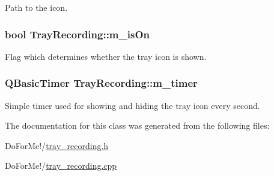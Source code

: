 Path to the icon. 

\hypertarget{class_tray_recording_a691345e2feccbcdfbe213083d9b5bd9e}{
\subsubsection[{m\-\_\-is\-On}]{\setlength{\rightskip}{0pt plus 5cm}bool Tray\-Recording\-::m\-\_\-is\-On\hspace{0.3cm}{\ttfamily [private]}}}\label{class_tray_recording_a691345e2feccbcdfbe213083d9b5bd9e}


Flag which determines whether the tray icon is shown. 

\hypertarget{class_tray_recording_a5332c59102a6d37f197c42207a5db0b3}{
\subsubsection[{m\-\_\-timer}]{\setlength{\rightskip}{0pt plus 5cm}Q\-Basic\-Timer Tray\-Recording\-::m\-\_\-timer\hspace{0.3cm}{\ttfamily [private]}}}\label{class_tray_recording_a5332c59102a6d37f197c42207a5db0b3}


Simple timer used for showing and hiding the tray icon every second. 



The documentation for this class was generated from the following files\-:\begin{DoxyCompactItemize}
\item 
Do\-For\-Me!/\hyperlink{tray__recording_8h}{tray\-\_\-recording.\-h}\item 
Do\-For\-Me!/\hyperlink{tray__recording_8cpp}{tray\-\_\-recording.\-cpp}\end{DoxyCompactItemize}

